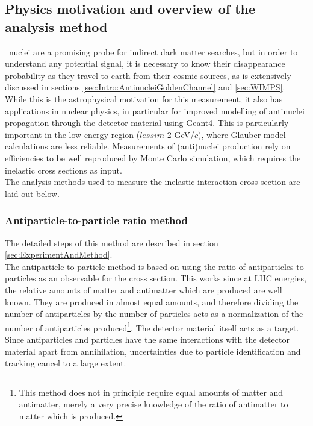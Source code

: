 \subsection{Physics motivation and overview of the analysis method}
\ahe\ nuclei are a promising probe for indirect dark matter searches, but in order to understand any potential signal, it is necessary to know their disappearance probability as they travel to earth from their cosmic sources, as is extensively discussed in sections \ref{sec:Intro:AntinucleiGoldenChannel} and \ref{sec:WIMPS}. While this is the astrophysical motivation for this measurement, it also has applications in nuclear physics, in particular for improved modelling of antinuclei propagation through the detector material using Geant4. This is particularly important in the low energy region ($lessim$ 2 GeV/$c$), where Glauber model calculations are less reliable. Measurements of (anti)nuclei production rely on efficiencies to be well reproduced by Monte Carlo simulation, which requires the inelastic cross sections as input. \\ 
The analysis methods used to measure the inelastic interaction cross section are laid out below. 
\subsubsection{Antiparticle-to-particle ratio method}
The detailed steps of this method are described in section \ref{sec:ExperimentAndMethod}.\\
The antiparticle-to-particle method is based on using the ratio of antiparticles to particles as an observable for the cross section. This works since at LHC energies, the relative amounts of matter and antimatter which are produced are well known. They are produced in almost equal amounts, and therefore dividing the number of antiparticles by the number of particles acts as a normalization of the number of antiparticles produced\footnote{This method does not in principle require equal amounts of matter and antimatter, merely a very precise knowledge of the ratio of antimatter to matter which is produced.}. The detector material itself acts as a target. Since antiparticles and particles have the same interactions with the detector material apart from annihilation, uncertainties due to particle identification and tracking cancel to a large extent. 

